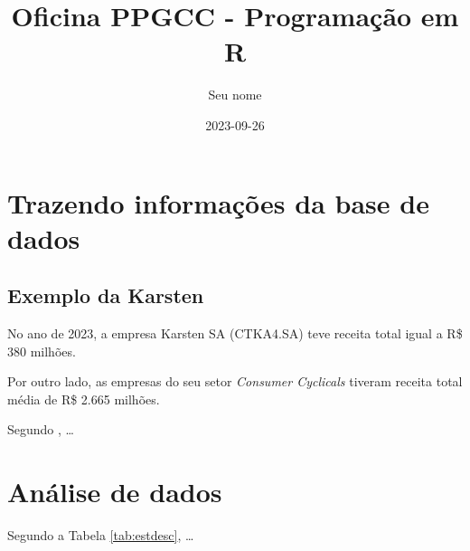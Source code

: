 \documentclass[
]{article}
\title{Oficina PPGCC - Programação em R}
\author{Seu nome}
\date{2023-09-26}
\begin{document}
\maketitle

\hypertarget{trazendo-informauxe7uxf5es-da-base-de-dados}{%
\section{Trazendo informações da base de dados}\label{trazendo-informauxe7uxf5es-da-base-de-dados}}

\hypertarget{exemplo-da-karsten}{%
\subsection{Exemplo da Karsten}\label{exemplo-da-karsten}}

No ano de 2023, a empresa Karsten SA (CTKA4.SA) teve receita total igual a R\$ 380 milhões.

Por outro lado, as empresas do seu setor \emph{Consumer Cyclicals} tiveram receita total média de R\$ 2.665 milhões.

Segundo \citet{matsumoto2012}, \ldots{}

\hypertarget{anuxe1lise-de-dados}{%
\section{Análise de dados}\label{anuxe1lise-de-dados}}

Segundo a Tabela \ref{tab:estdesc}, \ldots{}
\end{document}

